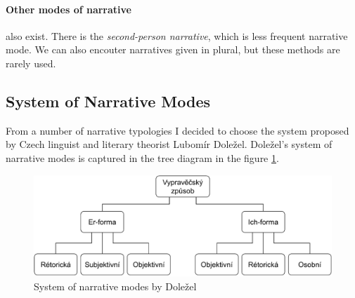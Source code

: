 \paragraph{Other modes of narrative} also exist. There is the \emph{second-person narrative}, which is less frequent narrative mode. We can also encouter narratives given in plural, but these methods are rarely used.

\subsection{System of Narrative Modes}

From a number of narrative typologies I decided to choose the system proposed by Czech linguist and literary theorist Lubomír Doležel. Doležel's system of narrative modes is captured in the tree diagram in the figure \ref{fig:schema-dolezel}.\cite{dolezel-narativni-zpusoby}

\begin{figure}[ht]
\includegraphics[width=1\textwidth]{data/dolezel-schema.pdf}
\caption{System of narrative modes by Doležel}
\label{fig:schema-dolezel}
\end{figure}



